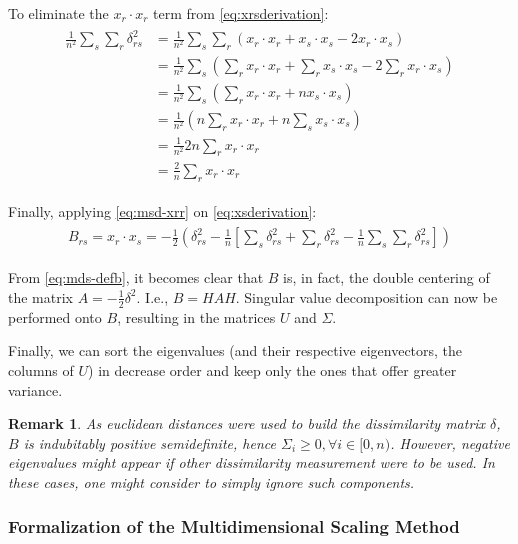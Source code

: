 \documentclass[12pt]{article}
\newtheorem{remark}{Remark}[section]
\begin{document}
To eliminate the $x_r\cdot x_r$ term from \ref{eq:xrsderivation}:
\begin{align}
\label{eq:msd-xrr}
\begin{split}
\frac{1}{n^2} \sum_s\sum_r\delta_{rs}^2 &= \frac{1}{n^2} \sum_s\sum_r(x_r\cdot x_r + x_s\cdot x_s -2x_r\cdot x_s)\\
&= \frac{1}{n^2}\sum_s(\sum_r x_r\cdot x_r + \sum_r x_s\cdot x_s -2\sum_r x_r\cdot x_s)\\
&= \frac{1}{n^2}\sum_s(\sum_r x_r\cdot x_r + n x_s\cdot x_s) \\
&= \frac{1}{n^2}(n \sum_r x_r\cdot x_r + n \sum_s x_s \cdot x_s) \\
&= \frac{1}{n^2} 2n \sum_r x_r\cdot x_r \\
&= \frac{2}{n} \sum_r x_r\cdot x_r
\end{split}
\end{align}

Finally, applying \ref{eq:msd-xrr} on \ref{eq:xsderivation}:
\begin{align}
\label{eq:mds-defb}
\begin{split}
B_{rs} = x_r\cdot x_s = -\frac{1}{2} (\delta_{rs}^2 - \frac{1}{n} [\sum_s \delta_{rs}^2 + \sum_r \delta_{rs}^2 - \frac{1}{n}\sum_s \sum_r \delta_{rs}^2])
\end{split}
\end{align}

From \ref{eq:mds-defb}, it becomes clear that $B$ is, in fact, the double centering of the matrix $A=-\frac{1}{2}\delta^2$. I.e., $B=HAH$. Singular value decomposition can now be performed onto $B$, resulting in the matrices $U$ and $\Sigma$.

Finally, we can sort the eigenvalues (and their respective eigenvectors, the columns of $U$) in decrease order and keep only the ones that offer greater variance.

\begin{remark}
	As euclidean distances were used to build the dissimilarity matrix $\delta$, $B$ is indubitably positive semidefinite, hence $\Sigma_i \ge 0, \forall i\in [0, n)$. However, negative eigenvalues might appear if other dissimilarity measurement were to be used. In these cases, one might consider to simply ignore such components.
\end{remark}

\subsubsection{Formalization of the Multidimensional Scaling Method}
\end{document}
